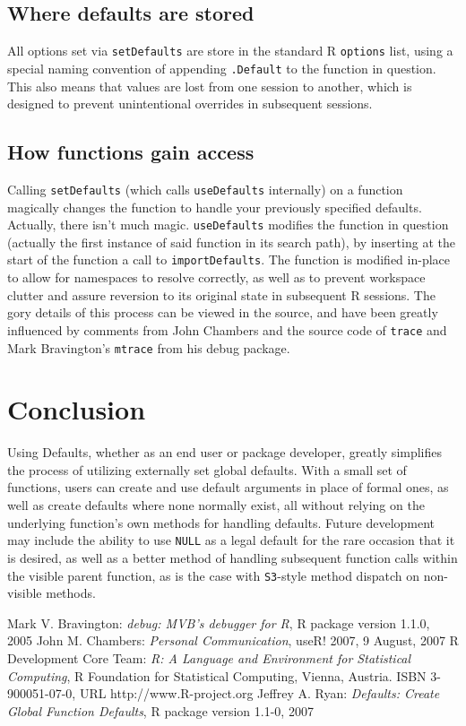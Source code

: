 \documentclass{article}
\begin{document}
\vspace{2mm}
\noindent
\subsection{Where defaults are stored}
All options set via {\tt setDefaults}
are store in the standard {\sf R} {\tt options} list, using
a special naming convention of appending {\tt .Default} to the
function in question. This also means that values are lost
from one session to another, which is designed to prevent
unintentional overrides in subsequent sessions.

\vspace{2mm}
\noindent
\subsection{How functions gain access}
Calling {\tt setDefaults} (which calls {\tt useDefaults} internally)
on a function magically changes
the function to handle your previously specified defaults.
Actually, there isn't much magic. {\tt useDefaults} modifies the
function in question (actually the first instance of said function
in its search path), by inserting at the start of the function
a call to {\tt importDefaults}. The function is modified {\sf in-place}
to allow for namespaces to resolve correctly, as well as to prevent
workspace clutter and assure reversion to its original state
in subsequent {\sf R} sessions. The gory details of
this process can be viewed in the source, and have been greatly influenced
by comments from John Chambers \cite{chambers} and the source code of {\tt trace} \cite{trace}
and Mark Bravington's {\tt mtrace} from his debug \cite{debug} package. 
 


\section{Conclusion}
Using {\sf Defaults}, whether as an end user or package developer,
greatly simplifies the process of utilizing externally set global
defaults. With a small set of functions, users can create and use
default arguments in place of formal ones, as well as create
defaults where none normally exist, all without relying on the underlying
function's own methods for handling defaults. Future development
may include the ability to use {\tt NULL} as a legal default for
the rare occasion that it is desired, as well as a better method of
handling subsequent function calls within the visible parent function,
as is the case with {\tt S3}-style method dispatch on non-visible methods.

\begin{thebibliography}{99}
 Mark V. Bravington:
\emph{debug: MVB's debugger for R},
R package version 1.1.0, 2005 
 John M. Chambers:
\emph{Personal Communication},
useR! 2007, 9 August, 2007
 R Development Core Team:
\emph{R: A Language and Environment for Statistical Computing},
R Foundation for Statistical Computing, Vienna, Austria.
ISBN 3-900051-07-0, URL http://www.R-project.org
 Jeffrey A. Ryan:
\emph{Defaults: Create Global Function Defaults},
R package version 1.1-0, 2007
\end{thebibliography}
\end{document}
